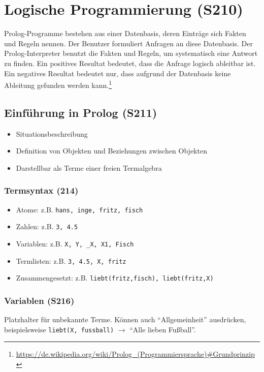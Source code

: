 \section{Logische Programmierung (S210)}
Prolog-Programme bestehen aus einer Datenbasis, deren Einträge sich Fakten und Regeln nennen. Der Benutzer formuliert Anfragen an diese Datenbasis. Der Prolog-Interpreter benutzt die Fakten und Regeln, um systematisch eine Antwort zu finden. Ein positives Resultat bedeutet, dass die Anfrage logisch ableitbar ist. Ein negatives Resultat bedeutet nur, dass aufgrund der Datenbasis keine Ableitung gefunden werden kann.\footnote{\url{https://de.wikipedia.org/wiki/Prolog_(Programmiersprache)\#Grundprinzip}}

\subsection{Einführung in Prolog (S211)}
\begin{itemize}
	\item Situationsbeschreibung
	\item Definition von Objekten und Beziehungen zwischen Objekten
	\item Darstellbar als Terme einer freien Termalgebra
\end{itemize}

\subsubsection{Termsyntax (214)}
\begin{itemize}
	\item Atome: z.B. \texttt{hans, inge, fritz, fisch}
	\item Zahlen: z.B. \texttt{3, 4.5}
	\item Variablen: z.B. \texttt{X, Y, \_X, X1, Fisch}
	\item Termlisten: z.B. \texttt{3, 4.5, X, fritz}
	\item Zusammengesetzt: z.B. \texttt{liebt(fritz,fisch), liebt(fritz,X)}
\end{itemize}

\subsubsection{Variablen (S216)}
Platzhalter für unbekannte Terme. Können auch "`Allgemeinheit"' ausdrücken, beispielsweise \texttt{liebt(X, fussball)} \(\rightarrow\) "`Alle lieben Fußball"'.

